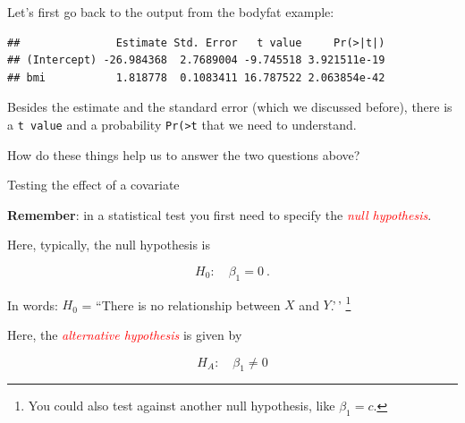 \documentclass[
  10pt,
  ignorenonframetext,
]{beamer}
\newenvironment{Shaded}{\begin{snugshade}}{\end{snugshade}}
\newcommand{\FunctionTok}[1]{\textcolor[rgb]{0.13,0.29,0.53}{\textbf{#1}}}
\newcommand{\NormalTok}[1]{#1}
\newcommand{\SpecialCharTok}[1]{\textcolor[rgb]{0.81,0.36,0.00}{\textbf{#1}}}
\begin{document}
\begin{frame}[fragile]
Let's first go back to the output from the bodyfat example:

\vspace{2mm}

\scriptsize

\begin{Shaded}
\end{Shaded}

\begin{verbatim}
##               Estimate Std. Error   t value     Pr(>|t|)
## (Intercept) -26.984368  2.7689004 -9.745518 3.921511e-19
## bmi           1.818778  0.1083411 16.787522 2.063854e-42
\end{verbatim}

\vspace{2mm}

\normalsize

Besides the estimate and the standard error (which we discussed before),
there is a \texttt{t\ value} and a probability
\texttt{Pr(\textgreater{}\textbar{}t\textbar{}} that we need to
understand.

How do these things help us to answer the two questions above?
\end{frame}

\begin{frame}
\begin{block}{Testing the effect of a covariate}
\protect\hypertarget{testing-the-effect-of-a-covariate}{}
\(~\)

\textbf{Remember}: in a statistical test you first need to specify the
\emph{\textcolor{red}{null hypothesis}}.

Here, typically, the null hypothesis is

\[H_0: \quad \beta_1 =   0  \ .\]

In words: \(H_0\) = ``There is no relationship between \(X\) and
\(Y\).'\,'
\footnote{You could also test against another null hypothesis, like $\beta_1=c$.}

\vspace{6mm}

Here, the \emph{\textcolor{red}{alternative hypothesis}} is given by
\(~\)

\[H_A: \quad \beta_1 \neq  0  \]
\end{block}
\end{frame}
\end{document}
